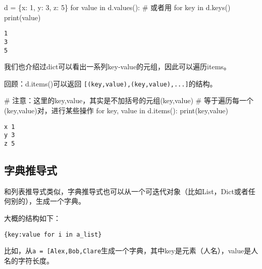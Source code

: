 \documentclass[
  letterpaper,
  DIV=11,
  numbers=noendperiod]{scrreprt}
\newenvironment{Shaded}{\begin{snugshade}}{\end{snugshade}}
\newcommand{\BuiltInTok}[1]{\textcolor[rgb]{0.00,0.23,0.31}{#1}}
\newcommand{\CommentTok}[1]{\textcolor[rgb]{0.37,0.37,0.37}{#1}}
\newcommand{\ControlFlowTok}[1]{\textcolor[rgb]{0.00,0.23,0.31}{#1}}
\newcommand{\DecValTok}[1]{\textcolor[rgb]{0.68,0.00,0.00}{#1}}
\newcommand{\KeywordTok}[1]{\textcolor[rgb]{0.00,0.23,0.31}{#1}}
\newcommand{\NormalTok}[1]{\textcolor[rgb]{0.00,0.23,0.31}{#1}}
\newcommand{\OperatorTok}[1]{\textcolor[rgb]{0.37,0.37,0.37}{#1}}
\newcommand{\StringTok}[1]{\textcolor[rgb]{0.13,0.47,0.30}{#1}}
\begin{document}
\begin{Shaded}
\begin{Highlighting}[]
\NormalTok{d }\OperatorTok{=}\NormalTok{ \{}\StringTok{\textquotesingle{}x\textquotesingle{}}\NormalTok{: }\DecValTok{1}\NormalTok{, }\StringTok{\textquotesingle{}y\textquotesingle{}}\NormalTok{: }\DecValTok{3}\NormalTok{, }\StringTok{\textquotesingle{}z\textquotesingle{}}\NormalTok{: }\DecValTok{5}\NormalTok{\}}
\ControlFlowTok{for}\NormalTok{ value }\KeywordTok{in}\NormalTok{ d.values(): }
\CommentTok{\# 或者用 for key in d.keys()}
    \BuiltInTok{print}\NormalTok{(value)}
\end{Highlighting}
\end{Shaded}

\begin{verbatim}
1
3
5
\end{verbatim}

我们也介绍过dict可以看出一系列key-value的元组，因此可以遍历items。

回顾：d.items()可以返回
\texttt{{[}(key,value),(key,value),...{]}}的结构。

\begin{Shaded}
\begin{Highlighting}[]
\CommentTok{\# 注意：这里的key,value，其实是不加括号的元组(key,value)}
\CommentTok{\# 等于遍历每一个(key,value)对，进行某些操作}
\ControlFlowTok{for}\NormalTok{ key, value }\KeywordTok{in}\NormalTok{ d.items():}
    \BuiltInTok{print}\NormalTok{(key,value)}
\end{Highlighting}
\end{Shaded}

\begin{verbatim}
x 1
y 3
z 5
\end{verbatim}

\hypertarget{ux5b57ux5178ux63a8ux5bfcux5f0f}{%
\subsection{字典推导式}\label{ux5b57ux5178ux63a8ux5bfcux5f0f}}

和列表推导式类似，字典推导式也可以从一个可迭代对象（比如List，Dict或者任何别的），生成一个字典。

大概的结构如下：

\texttt{\{key:value\ for\ i\ in\ a\_list\}}

比如，从\texttt{a\ =\ {[}\textquotesingle{}Alex\textquotesingle{},\textquotesingle{}Bob\textquotesingle{},\textquotesingle{}Clare\textquotesingle{}{]}}生成一个字典，其中key是元素（人名），value是人名的字符长度。
\end{document}
